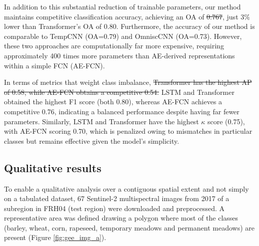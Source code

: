 \documentclass[journal,article,submit,pdftex,moreauthors]{Definitions/mdpi}
\providecommand{\DIFadd}[1]{{\protect\color{blue}\uwave{#1}}} %
\providecommand{\DIFdel}[1]{{\protect\color{red}\sout{#1}}}                      %
\providecommand{\DIFaddbegin}{} %
\providecommand{\DIFaddend}{} %
\providecommand{\DIFdelbegin}{} %
\providecommand{\DIFdelend}{} %
\begin{document}
In addition to this substantial reduction of trainable parameters, our method maintains competitive classification accuracy, achieving an OA of \DIFdelbegin \DIFdel{0.767}\DIFdelend \DIFaddbegin \DIFadd{0.7706}\DIFaddend , just $3\%$ lower than Transformer's OA of 0.80. Furthermore, the accuracy of our method is comparable to TempCNN (OA=0.79) and \DIFaddbegin \DIFadd{4\% better than }\DIFaddend OmniscCNN (OA=0.73). However, these two approaches are computationally far more expensive, requiring approximately 400 times more parameters than AE-derived representations within a simple FCN (AE-FCN).

In terms of metrics that weight class imbalance, \DIFdelbegin \DIFdel{Transformer has the highest AP of 0.58, while AE-FCN obtains a competitive 0.54. }\DIFdelend LSTM and Transformer obtained the highest F1 score (both 0.80), whereas AE-FCN achieves a competitive 0.76, indicating a balanced performance despite having far fewer parameters. Similarly, LSTM and Transformer have the highest $\kappa$ score (0.75), with AE-FCN scoring 0.70, which is penalized owing to mismatches in particular classes but remains effective given the model's simplicity.

\subsection{Qualitative results}

To enable a qualitative analysis over a contiguous spatial extent and not simply on a tabulated dataset, 67 Sentinel-2 multispectral images from 2017 of a subregion in FRH04 (test region) were downloaded and preprocessed.
A representative area was defined drawing a polygon where most of the classes (barley, wheat, corn, rapeseed, temporary meadows and permanent meadows) are present (Figure \ref{fig:gee_img_a}). 
\end{document}
